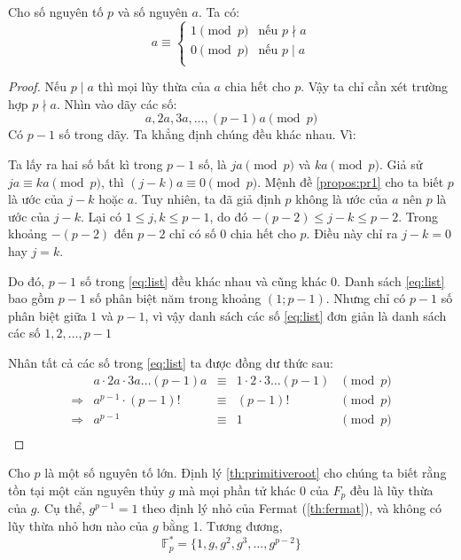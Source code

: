 \begin{theorem}
	\label{th:fermat}
	Cho số nguyên tố $p$ và số nguyên $a$. Ta có:
	$$ a \equiv \begin{cases}
			1 \pmod{p} & \text{nếu }  p\nmid a \\
			0 \pmod{p} & \text{nếu }  p\mid a  \\
		\end{cases} $$
\end{theorem}
\begin{proof}
	Nếu $p \mid a$ thì mọi lũy thừa của $a$ chia hết cho $p$. Vậy ta chỉ cần xét trường hợp $p \nmid a$.
	Nhìn vào dãy các số:
	\begin{equation}
		\label{eq:list}
		a, 2a, 3a, \ldots, (p-1)a \pmod{p}%
	\end{equation}
	Có $p-1$ số trong dãy. Ta khẳng định chúng đều khác nhau. Vì:

	Ta lấy ra hai số bất kì trong $p-1$ số, là $ja \pmod{p}$ và $ka \pmod{p}$. Giả sử $ja \equiv ka \pmod{p}$, thì $(j-k)a \equiv 0 \pmod{p}$.
	Mệnh đề \ref{propos:pr1} cho ta biết $p$ là ước của $j-k$ hoặc $a$.
	Tuy nhiên, ta đã giả định $p$ không là ước của $a$ nên $p$ là ước của $j-k$.
	Lại có $1 \leq j, k \leq p-1$, do đó $-(p-2) \leq j-k \leq p-2$.
	Trong khoảng $-(p-2)$ đến $p-2$ chỉ có số $0$ chia hết cho $p$. Điều này chỉ ra $j-k = 0$ hay $j=k$.

	Do đó, $p-1$ số trong \eqref{eq:list} đều khác nhau và cũng khác $0$.
	Danh sách \eqref{eq:list} bao gồm $p - 1$ số phân biệt năm trong khoảng $(1; p - 1)$. Nhưng
	chỉ có $p - 1$ số phân biệt giữa $1$ và $p - 1$, vì vậy danh sách các số \eqref{eq:list} đơn giản là danh sách các số $1,2, \ldots, p - 1$

	Nhân tất cả các số trong \eqref{eq:list} ta được đồng dư thức sau:
	$$\begin{array}{crclc}
			            & a\cdot 2a \cdot 3a \ldots (p-1)a & \equiv & 1\cdot 2 \cdot 3 \ldots (p-1) & \pmod{p} \\
			\Rightarrow & a^{p-1} \cdot (p-1)!             & \equiv & (p-1)!                        & \pmod{p} \\
			\Rightarrow & a^{p-1}                          & \equiv & 1                             & \pmod{p} \\
		\end{array}$$
\end{proof}

Cho $p$ là một số nguyên tố lớn. Định lý \ref{th:primitiveroot} cho chúng ta biết
rằng tồn tại một căn nguyên thủy $g$ mà mọi phần tử khác $0$ của $F_p$ đều là lũy thừa của $g$. Cụ thể, $g^{p-1} = 1$ theo định lý nhỏ của Fermat (\ref{th:fermat}),
và không có lũy thừa nhỏ hơn nào của $g$ bằng 1. Tương đương,
$$ \mathbb{F}^*_p = \{1, g, g^2, g^3, \ldots, g^{p-2} \}$$

